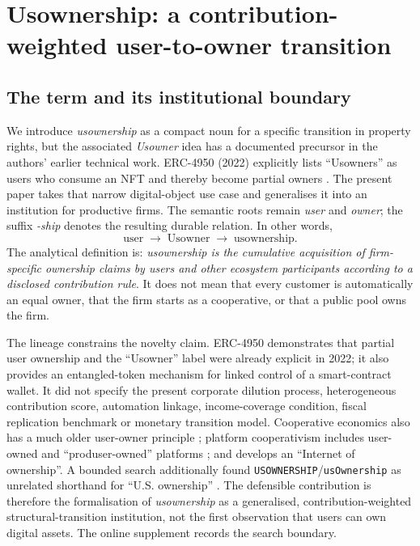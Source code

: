 \section{Usownership: a contribution-weighted user-to-owner transition}
\subsection{The term and its institutional boundary}
We introduce \emph{usownership} as a compact noun for a specific transition in property rights, but the associated \emph{Usowner} idea has a documented precursor in the authors' earlier technical work. ERC-4950 (2022) explicitly lists ``Usowners'' as users who consume an NFT and thereby become partial owners \citep{erc4950}. The present paper takes that narrow digital-object use case and generalises it into an institution for productive firms. The semantic roots remain \emph{user} and \emph{owner}; the suffix \emph{-ship} denotes the resulting durable relation. In other words,
\[
\text{user}\;\longrightarrow\;\text{Usowner}\;\longrightarrow\;\text{usownership}.
\]
The analytical definition is: \emph{usownership is the cumulative acquisition of firm-specific ownership claims by users and other ecosystem participants according to a disclosed contribution rule}. It does not mean that every customer is automatically an equal owner, that the firm starts as a cooperative, or that a public pool owns the firm.

The lineage constrains the novelty claim. ERC-4950 demonstrates that partial user ownership and the ``Usowner'' label were already explicit in 2022; it also provides an entangled-token mechanism for linked control of a smart-contract wallet. It did not specify the present corporate dilution process, heterogeneous contribution score, automation linkage, income-coverage condition, fiscal replication benchmark or monetary transition model. Cooperative economics also has a much older user-owner principle \citep{dunn1988,zeuliradel2005}; platform cooperativism includes user-owned and ``produser-owned'' platforms \citep{scholz2016}; and \citet{schneider2018} develops an ``Internet of ownership''. A bounded search additionally found \texttt{USOWNERSHIP}/\texttt{usOwnership} as unrelated shorthand for ``U.S. ownership'' \citep{straitsx2026}. The defensible contribution is therefore the formalisation of \emph{usownership} as a generalised, contribution-weighted structural-transition institution, not the first observation that users can own digital assets. The online supplement records the search boundary.

